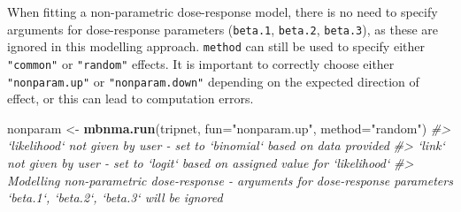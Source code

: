 \documentclass[]{article}
\newenvironment{Shaded}{\begin{snugshade}}{\end{snugshade}}
\newcommand{\CommentTok}[1]{\textcolor[rgb]{0.56,0.35,0.01}{\textit{#1}}}
\newcommand{\DataTypeTok}[1]{\textcolor[rgb]{0.13,0.29,0.53}{#1}}
\newcommand{\KeywordTok}[1]{\textcolor[rgb]{0.13,0.29,0.53}{\textbf{#1}}}
\newcommand{\NormalTok}[1]{#1}
\newcommand{\StringTok}[1]{\textcolor[rgb]{0.31,0.60,0.02}{#1}}
\begin{document}
When fitting a non-parametric dose-response model, there is no need to
specify arguments for dose-response parameters (\texttt{beta.1},
\texttt{beta.2}, \texttt{beta.3}), as these are ignored in this
modelling approach. \texttt{method} can still be used to specify either
\texttt{"common"} or \texttt{"random"} effects. It is important to
correctly choose either \texttt{"nonparam.up"} or
\texttt{"nonparam.down"} depending on the expected direction of effect,
or this can lead to computation errors.

\begin{Shaded}
\begin{Highlighting}[]
\NormalTok{nonparam <-}\StringTok{ }\KeywordTok{mbnma.run}\NormalTok{(tripnet, }\DataTypeTok{fun=}\StringTok{"nonparam.up"}\NormalTok{, }\DataTypeTok{method=}\StringTok{"random"}\NormalTok{)}
\CommentTok{#> `likelihood` not given by user - set to `binomial` based on data provided}
\CommentTok{#> `link` not given by user - set to `logit` based on assigned value for `likelihood`}
\CommentTok{#> Modelling non-parametric dose-response - arguments for dose-response parameters `beta.1`, `beta.2`, `beta.3` will be ignored}
\end{Highlighting}
\end{Shaded}
\end{document}
